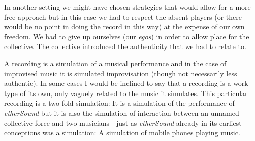In another setting we might have chosen strategies that would allow
for a more free approach but in this case we had to respect the absent
players (or there would be no point in doing the record in this way)
at the expense of our own freedom. We had to give up ourselves (our
\emph{egos}) in order to allow place for the collective. The
collective introduced the authenticity that we had to relate to.

A recording is a simulation of a musical performance and in the case
of improvised music it is simulated improvisation (though not
necessarily less authentic). In some cases I would be
inclined to say that a recording is a work type of its own, only
vaguely related to the music it simulates. This particular recording
is a two fold simulation: It is a simulation of the performance of
\emph{etherSound} but it is also the simulation of interaction between
an unnamed collective force and two musicians---just as
\emph{etherSound} already in its earliest conceptions was a
simulation: A simulation of mobile phones playing music.

